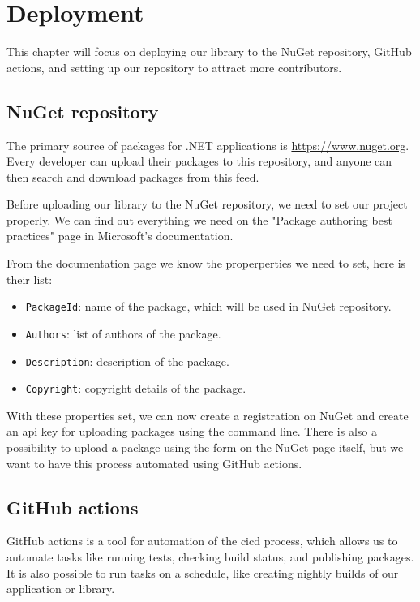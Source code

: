 \chapter {Deployment}

This chapter will focus on deploying our library to the NuGet repository, GitHub actions, and setting up our repository to attract more contributors.

\section {NuGet repository}

The primary source of packages for .NET applications is \url{https://www.nuget.org}.
Every developer can upload their packages to this repository, and anyone can then search and download packages from this feed.

Before uploading our library to the NuGet repository, we need to set our project properly.
We can find out everything we need on the "Package authoring best practices" page in Microsoft's documentation. \cite{chgill-msft_package_nodate}

From the documentation page \cite{chgill-msft_package_nodate} we know the properperties we need to set, here is their list:

\begin{itemize}
    \item \texttt{PackageId}: name of the package, which will be used in NuGet repository.
    \item \texttt{Authors}: list of authors of the package.
    \item \texttt{Description}: description of the package.
    \item \texttt{Copyright}: copyright details of the package.
\end{itemize}

With these properties set, we can now create a registration on NuGet and create an \acrshort{api} key for uploading packages using the command line.
There is also a possibility to upload a package using the form on the NuGet page itself, but we want to have this process automated using GitHub actions.

\section{GitHub actions}

GitHub actions is a tool for automation of the \acrfull{cicd} process, which allows us to automate tasks like running tests, checking build status, and publishing packages.
It is also possible to run tasks on a schedule, like creating nightly builds of our application or library.

